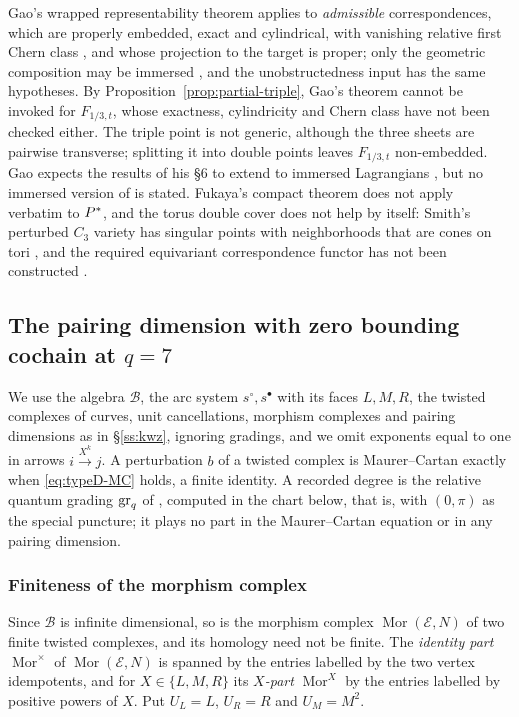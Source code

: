 Gao's wrapped representability theorem \cite[Thm.~7.24 and Cor.~7.25]{Gao} applies to
\emph{admissible} correspondences, which are properly embedded, exact and cylindrical, with vanishing
relative first Chern class \cite[Def.~6.3, Def.~7.2 and the standing convention of \S7.1]{Gao}, and
whose projection to the target is proper; only the geometric composition may be immersed
\cite[Assumption~7.10]{Gao}, and the unobstructedness input \cite[Thm.~7.12]{Gao} has the same
hypotheses.  By Proposition~\ref{prop:partial-triple}, Gao's theorem cannot be invoked for
$F_{1/3,t}$, whose exactness, cylindricity and Chern class have not been checked either.  The triple
point is not generic, although the three sheets are pairwise transverse; splitting it into double
points leaves $F_{1/3,t}$ non-embedded.  Gao expects the results of his \S6 to extend to immersed
Lagrangians \cite[Rem.~6.1]{Gao}, but no immersed version of \cite[Thm.~7.24]{Gao} is stated.
Fukaya's compact theorem \cite{FukayaCorr} does not apply verbatim to $P^{*}$, and the torus double
cover does not help by itself: Smith's perturbed $C_3$ variety has singular points with neighborhoods
that are cones on tori \cite[Thm.~4.16]{Smith}, and the required equivariant correspondence functor
has not been constructed \cite[\S11.5]{CHKK}.

\subsection{The pairing dimension with zero bounding cochain at \texorpdfstring{$q=7$}{q=7}}\label{sec:typeD}
We use the algebra $\mathcal B$, the arc system $s^\circ,s^\bullet$ with its faces $L,M,R$,
the twisted complexes of curves, unit cancellations, morphism complexes and pairing dimensions as in
\S\ref{ss:kwz}, ignoring gradings, and we omit exponents equal to one in arrows
$i\xrightarrow{X^k}j$.  A perturbation $b$ of a twisted complex is Maurer--Cartan exactly when
\eqref{eq:typeD-MC} holds, a finite identity.  A recorded degree is the relative quantum grading
$\operatorname{gr}_q$ of \cite{KWZ}, computed in the chart below, that is, with $(0,\pi)$ as the special puncture; it plays
no part in the Maurer--Cartan equation or in any pairing dimension.

\subsubsection{Finiteness of the morphism complex}
Since $\mathcal B$ is infinite dimensional, so is the morphism complex $\operatorname{Mor}(\mathcal
E,N)$ of two finite twisted complexes, and its homology need not be finite.  The \emph{identity part}
$\operatorname{Mor}^\times$ of $\operatorname{Mor}(\mathcal E,N)$ is spanned by the entries labelled
by the two vertex idempotents, and for $X\in\{L,M,R\}$ its \emph{$X$-part} $\operatorname{Mor}^X$ by
the entries labelled by positive powers of $X$.  Put $U_L=L$, $U_R=R$ and $U_M=M^2$.

